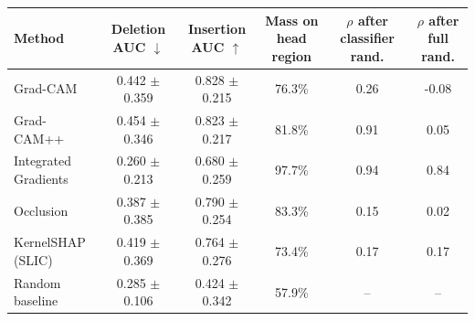 \begin{tabular}{lccccc}
\toprule
Method & Deletion AUC $\downarrow$ & Insertion AUC $\uparrow$ & Mass on head region & $\rho$ after classifier rand. & $\rho$ after full rand. \\
\midrule
Grad-CAM & 0.442 $\pm$ 0.359 & 0.828 $\pm$ 0.215 & 76.3\% & 0.26 & -0.08 \\
Grad-CAM++ & 0.454 $\pm$ 0.346 & 0.823 $\pm$ 0.217 & 81.8\% & 0.91 & 0.05 \\
Integrated Gradients & 0.260 $\pm$ 0.213 & 0.680 $\pm$ 0.259 & 97.7\% & 0.94 & 0.84 \\
Occlusion & 0.387 $\pm$ 0.385 & 0.790 $\pm$ 0.254 & 83.3\% & 0.15 & 0.02 \\
KernelSHAP (SLIC) & 0.419 $\pm$ 0.369 & 0.764 $\pm$ 0.276 & 73.4\% & 0.17 & 0.17 \\
Random baseline & 0.285 $\pm$ 0.106 & 0.424 $\pm$ 0.342 & 57.9\% & -- & -- \\
\bottomrule
\end{tabular}